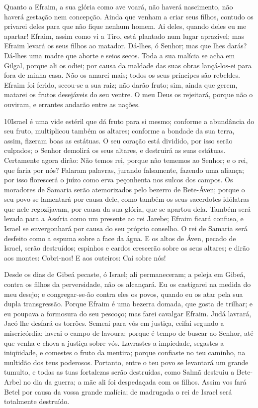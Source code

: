 Quanto a Efraim, a sua glória como ave voará, não haverá
nascimento, não haverá gestação nem concepção. Ainda que
venham a criar seus filhos, contudo os privarei deles para que não
fique nenhum homem. Ai deles, quando deles eu me apartar!
Efraim, assim como vi a Tiro, está plantado num lugar
aprazível; mas Efraim levará os seus filhos ao matador.
Dá-lhes, ó Senhor; mas que lhes darás? Dá-lhes uma madre que
aborte e seios secos. Toda a sua malícia se acha em Gilgal,
porque ali os odiei; por causa da maldade das suas obras
lançá-los-ei para fora de minha casa. Não os amarei mais; todos os
seus príncipes são rebeldes. Efraim foi ferido, secou-se a
sua raiz; não darão fruto; sim, ainda que gerem, matarei os frutos
desejáveis do seu ventre. O meu Deus os rejeitará, porque não
o ouviram, e errantes andarão entre as nações.

\medskip

\lettrine{10} Israel é uma vide estéril que dá fruto para si
mesmo; conforme a abundância do seu fruto, multiplicou também os
altares; conforme a bondade da sua terra, assim, fizeram boas as
estátuas. O seu coração está dividido, por isso serão culpados;
o Senhor demolirá os seus altares, e destruirá as suas estátuas.
Certamente agora dirão: Não temos rei, porque não tememos ao
Senhor; e o rei, que faria por nós? Falaram palavras, jurando
falsamente, fazendo uma aliança; por isso florescerá o juízo como
erva peçonhenta nos sulcos dos campos. Os moradores de Samaria
serão atemorizados pelo bezerro de Bete-Áven; porque o seu povo se
lamentará por causa dele, como também os seus sacerdotes idólatras
que nele regozijavam, por causa da sua glória, que se apartou dela.
Também será levada para a Assíria como um presente ao rei
Jarebe; Efraim ficará confuso, e Israel se envergonhará por causa do
seu próprio conselho. O rei de Samaria será desfeito como a
espuma sobre a face da água. E os altos de Áven, pecado de
Israel, serão destruídos; espinhos e cardos crescerão sobre os seus
altares; e dirão aos montes: Cobri-nos! E aos outeiros: Caí sobre
nós!

Desde os dias de Gibeá pecaste, ó Israel; ali permaneceram; a
peleja em Gibeá, contra os filhos da perversidade, não os alcançará.
Eu os castigarei na medida do meu desejo; e congregar-se-ão
contra eles os povos, quando eu os atar pela sua dupla transgressão.
Porque Efraim é uma bezerra domada, que gosta de trilhar; e
eu poupava a formosura do seu pescoço; mas farei cavalgar Efraim.
Judá lavrará, Jacó lhe desfará os torrões. Semeai para vós em
justiça, ceifai segundo a misericórdia; lavrai o campo de lavoura;
porque é tempo de buscar ao Senhor, até que venha e chova a justiça
sobre vós. Lavrastes a impiedade, segastes a iniqüidade, e
comestes o fruto da mentira; porque confiaste no teu caminho, na
multidão dos teus poderosos. Portanto, entre o teu povo se
levantará um grande tumulto, e todas as tuas fortalezas serão
destruídas, como Salmã destruiu a Bete-Arbel no dia da guerra; a mãe
ali foi despedaçada com os filhos. Assim vos fará Betel por
causa da vossa grande malícia; de madrugada o rei de Israel será
totalmente destruído.

